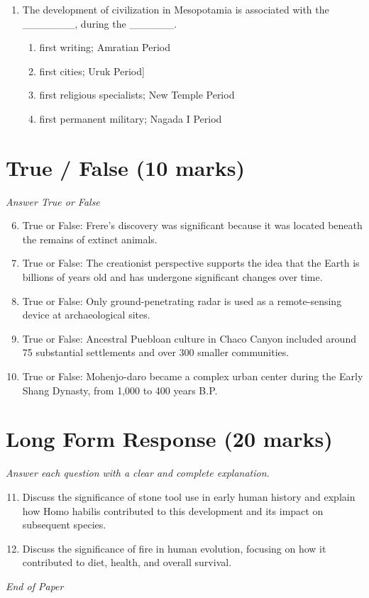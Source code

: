 \documentclass[12pt]{article}
\begin{document}
\begin{enumerate}[label=\arabic*.]
\begin{enumerate}[label=(\alph*)]
    \item evolved into a more sophisticated technology.
\end{enumerate}
\item The development of civilization in Mesopotamia is associated with the \_\_\_\_\_\_\_, during the \_\_\_\_\_\_.
\begin{enumerate}[label=(\alph*)]
    \item first writing; Amratian Period
    \item first cities; Uruk Period]
    \item first religious specialists; New Temple Period
    \item first permanent military; Nagada I Period
\end{enumerate}
\end{enumerate}

\section*{True / False (10 marks)}
\textit{Answer True or False}
\begin{enumerate}[label=\arabic*.]
\setcounter{enumi}{5}
\item True or False: Frere's discovery was significant because it was located beneath the remains of extinct animals.
\item True or False: The creationist perspective supports the idea that the Earth is billions of years old and has undergone significant changes over time.
\item True or False: Only ground-penetrating radar is used as a remote-sensing device at archaeological sites.
\item True or False: Ancestral Puebloan culture in Chaco Canyon included around 75 substantial settlements and over 300 smaller communities.
\item True or False: Mohenjo-daro became a complex urban center during the Early Shang Dynasty, from 1,000 to 400 years B.P.
\end{enumerate}

\section*{Long Form Response (20 marks)}
\textit{Answer each question with a clear and complete explanation.}
\begin{enumerate}[label=\arabic*.]
\setcounter{enumi}{10}
\item Discuss the significance of stone tool use in early human history and explain how Homo habilis contributed to this development and its impact on subsequent species.
\item Discuss the significance of fire in human evolution, focusing on how it contributed to diet, health, and overall survival.
\end{enumerate}

\vfill
\noindent\textit{End of Paper}
\end{document}
